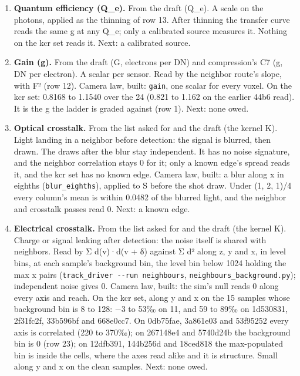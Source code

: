 \begin{enumerate}
\begin{itemize}
\item Prior art, cited from knowledge. The Fano factor of a thinned count, f′ − 1 = q(f − 1), from the photocount statistics of sub-Poisson light: L. Mandel, “Sub-Poissonian photon statistics in resonance fluorescence”, Opt. Lett. 4(7), 1979, 205–207.
\end{itemize}
\item \textbf{Quantum efficiency (Q\_\allowbreak{}e).} From the draft (Q\_\allowbreak{}e). A scale on the photons, applied as the thinning of row 13. After thinning the transfer curve reads the same g at any Q\_\allowbreak{}e; only a calibrated source measures it. Nothing on the kcr set reads it. Next: a calibrated source.
\item \textbf{Gain (g).} From the draft (G, electrons per DN) and compression's C7 (g, DN per electron). A scalar per sensor. Read by the neighbor route's slope, with F² (row 12). Camera law, built: \texttt{gain}, one scalar for every voxel. On the kcr set: 0.8168 to 1.1540 over the 24 (0.821 to 1.162 on the earlier 44b6 read). It is the g the ladder is graded against (row 1). Next: none owed.
\item \textbf{Optical crosstalk.} From the list asked for and the draft (the kernel K). Light landing in a neighbor before detection: the signal is blurred, then drawn. The draws after the blur stay independent. It has no noise signature, and the neighbor correlation stays 0 for it; only a known edge's spread reads it, and the kcr set has no known edge. Camera law, built: a blur along x in eighths (\texttt{blur\_\allowbreak{}eighths}), applied to S before the shot draw. Under (1, 2, 1)/4 every column's mean is within 0.0482 of the blurred light, and the neighbor and crosstalk passes read 0. Next: a known edge.
\item \textbf{Electrical crosstalk.} From the list asked for and the draft (the kernel K). Charge or signal leaking after detection: the noise itself is shared with neighbors. Read by Σ d(v)·d(v + δ) against Σ d² along z, y and x, in level bins, at each sample's background bin, the level bin below 1024 holding the max x pairs (\texttt{track\_\allowbreak{}driver -\allowbreak{}-\allowbreak{}run neighbours}, \texttt{neighbours\_\allowbreak{}background.\allowbreak{}py}); independent noise gives 0. Camera law, built: the sim's null reads 0 along every axis and reach. On the kcr set, along y and x on the 15 samples whose background bin is 8 to 128: −3 to 53‰ on 11, and 59 to 89‰ on 1d530831, 2f31fc2f, 33b596bf and 668e0cc7. On 0db75fae, 3a861e03 and 53f95252 every axis is correlated (220 to 370‰); on 267148e4 and 5740d24b the background bin is 0 (row 23); on 12dfb391, 144b256d and 18ced818 the max-populated bin is inside the cells, where the axes read alike and it is structure. Small along y and x on the clean samples. Next: none owed.

\end{enumerate}
